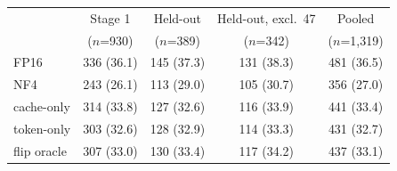 \begin{tabular}{lcccc}
\toprule
 & Stage 1 & Held-out & Held-out, excl.\ 47 & Pooled \\
 & ($n$=930) & ($n$=389) & ($n$=342) & ($n$=1{,}319) \\
\midrule
FP16 & 336 (36.1) & 145 (37.3) & 131 (38.3) & 481 (36.5) \\
NF4 & 243 (26.1) & 113 (29.0) & 105 (30.7) & 356 (27.0) \\
cache-only & 314 (33.8) & 127 (32.6) & 116 (33.9) & 441 (33.4) \\
token-only & 303 (32.6) & 128 (32.9) & 114 (33.3) & 431 (32.7) \\
flip oracle & 307 (33.0) & 130 (33.4) & 117 (34.2) & 437 (33.1) \\
\bottomrule
\end{tabular}
